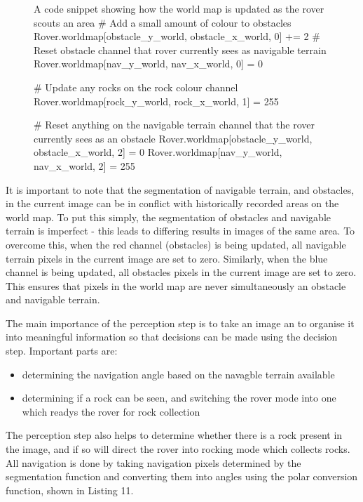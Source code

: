 \documentclass[a4paper]{article}
\begin{document}
\begin{figure}[h]\scriptsize
\begin{sexylisting}{A code snippet showing how the world map is updated as the rover scouts an area}
# Add a small amount of colour to obstacles
    Rover.worldmap[obstacle_y_world, obstacle_x_world, 0] += 2
    # Reset obstacle channel that rover currently sees as navigable terrain
    Rover.worldmap[nav_y_world, nav_x_world, 0] = 0
    
    # Update any rocks on the rock colour channel
    Rover.worldmap[rock_y_world, rock_x_world, 1] = 255 
    
    # Reset anything on the navigable terrain channel that the rover currently sees as an obstacle
    Rover.worldmap[obstacle_y_world, obstacle_x_world, 2] = 0
    Rover.worldmap[nav_y_world, nav_x_world, 2] = 255
\end{sexylisting}
\end{figure}

It is important to note that the segmentation of navigable terrain, and obstacles, in the current image can be in conflict with historically recorded areas on the world map. To put this simply, the segmentation of obstacles and navigable terrain is imperfect - this leads to differing results in images of the same area. To overcome this, when the red channel (obstacles) is being updated, all navigable terrain pixels in the current image are set to zero. Similarly, when the blue channel is being updated, all obstacles pixels in the current image are set to zero. This ensures that pixels in the world map are never simultaneously an obstacle and navigable terrain.\\

\newpage

The main importance of the perception step is to take an image an to organise it into meaningful information so that decisions can be made using the decision step. Important parts are:
\begin{itemize}
\item determining the navigation angle based on the navagble terrain available
\item determining if a rock can be seen, and switching the rover mode into one which readys the rover for rock collection
\end{itemize}

The perception step also helps to determine whether there is a rock present in the image, and if so will direct the rover into rocking mode which collects rocks. All navigation is done by taking navigation pixels determined by the segmentation function and converting them into angles using the polar conversion function, shown in Listing 11.
\end{document}
